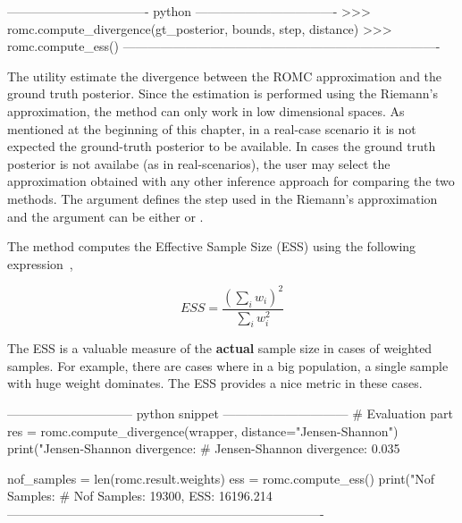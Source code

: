 \begin{Code}
---------------------------------- python ----------------------------------  
>>> romc.compute_divergence(gt_posterior, bounds, step, distance)
>>> romc.compute_ess()
----------------------------------------------------------------------------
\end{Code}

\noindent
The utility  estimate the divergence between
the ROMC approximation and the ground truth posterior. Since the
estimation is performed using the Riemann's approximation, the method
can only work in low dimensional spaces. As mentioned at the beginning
of this chapter, in a real-case scenario it is not expected the
ground-truth posterior to be available. In cases the ground truth
posterior is not availabe (as in real-scenarios), the user may select
the approximation obtained with any other inference approach for
comparing the two methods. The argument  defines the step
used in the Riemann's approximation and the argument 
can be either  or .

The method  computes the Effective Sample Size (ESS)
using the following expression~\cite{Sudman1967},

\begin{equation} \label{eq:ESS}
  ESS = \frac{(\sum_i w_i)^2}{\sum_i w_i^2}
\end{equation}

The ESS is a valuable measure of the \textbf{actual} sample size in
cases of weighted samples. For example, there are cases where in a big
population, a single sample with huge weight dominates. The ESS
provides a nice metric in these cases.

\begin{Code}
------------------------------ python snippet ------------------------------  
  # Evaluation part
  res = romc.compute_divergence(wrapper, distance="Jensen-Shannon")                                 
  print("Jensen-Shannon divergence: %
  # Jensen-Shannon divergence: 0.035

  nof_samples = len(romc.result.weights)
  ess = romc.compute_ess()
  print("Nof Samples: %
  # Nof Samples: 19300, ESS: 16196.214
----------------------------------------------------------------------------  
\end{Code}
